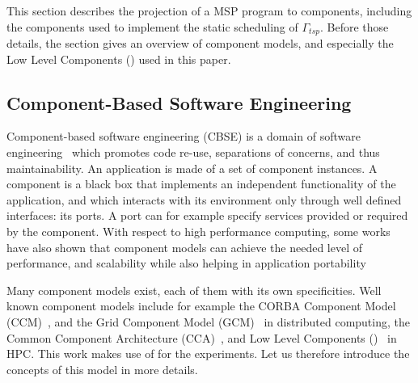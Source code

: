 This section describes the projection of a MSP program to components, including the components used to implement the static scheduling of $\Gamma_{tsp}$.
Before those details, the section gives an overview of component models, and especially the Low Level Components (\llc) used in this paper.


\subsection{Component-Based Software Engineering}
Component-based software engineering (CBSE) is a domain of software engineering~\cite{Szyperski:2002:CSB:515228} which promotes code
re-use, separations of concerns, and thus maintainability.
An application is made of a set of component instances.
A component is a black box that implements an independent functionality of the application, and which interacts with its environment only through well defined interfaces: its ports.
A port can for example specify services provided or required by the component.
With respect to high performance computing, some works have also shown
that component models can achieve the needed level of performance, and
scalability while also helping in application
portability~\cite{Bernholdt01052006, bigot:inria-00388508, UCHPC2015}

Many component models exist, each of them with its own specificities.
Well known component models include for example the CORBA Component Model (CCM)~\cite{corba:omg06}, and the Grid Component Model (GCM)~\cite{Baude} in distributed computing, the Common Component Architecture (CCA)~\cite{Bernholdt01052006}, and Low Level Components (\llc)~\cite{l2c} in HPC.
This work makes use of \llc for the experiments.
Let us therefore introduce the concepts of this model in more details.

\subsection{\llc}

